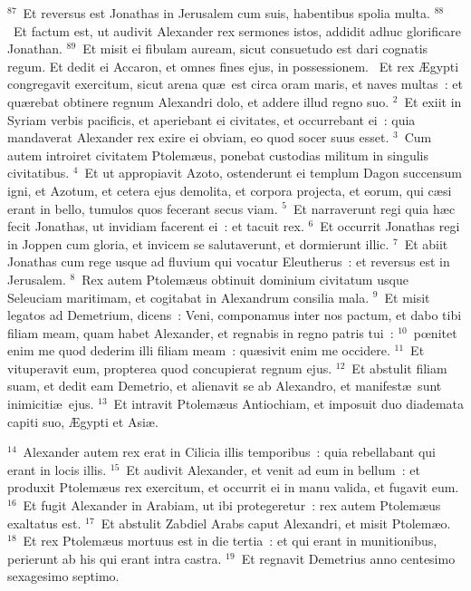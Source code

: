 ${}^{87}$~Et reversus est Jonathas in Jerusalem cum suis, habentibus spolia multa.
${}^{88}$~Et factum est, ut audivit Alexander rex sermones istos, addidit adhuc glorificare Jonathan.
${}^{89}$~Et misit ei fibulam auream, sicut consuetudo est dari cognatis regum. Et dedit ei Accaron, et omnes fines ejus, in possessionem.
~Et rex \AE gypti congregavit exercitum, sicut arena qu\ae\ est circa oram maris, et naves multas~: et qu\ae rebat obtinere regnum Alexandri dolo, et addere illud regno suo.
${}^{2}$~Et exiit in Syriam verbis pacificis, et aperiebant ei civitates, et occurrebant ei~: quia mandaverat Alexander rex exire ei obviam, eo quod socer suus esset.
${}^{3}$~Cum autem introiret civitatem Ptolem\ae us, ponebat custodias militum in singulis civitatibus.
${}^{4}$~Et ut appropiavit Azoto, ostenderunt ei templum Dagon succensum igni, et Azotum, et cetera ejus demolita, et corpora projecta, et eorum, qui c\ae si erant in bello, tumulos quos fecerant secus viam.
${}^{5}$~Et narraverunt regi quia h\ae c fecit Jonathas, ut invidiam facerent ei~: et tacuit rex.
${}^{6}$~Et occurrit Jonathas regi in Joppen cum gloria, et invicem se salutaverunt, et dormierunt illic.
${}^{7}$~Et abiit Jonathas cum rege usque ad fluvium qui vocatur Eleutherus~: et reversus est in Jerusalem.
${}^{8}$~Rex autem Ptolem\ae us obtinuit dominium civitatum usque Seleuciam maritimam, et cogitabat in Alexandrum consilia mala.
${}^{9}$~Et misit legatos ad Demetrium, dicens~: Veni, componamus inter nos pactum, et dabo tibi filiam meam, quam habet Alexander, et regnabis in regno patris tui~:
${}^{10}$~pœnitet enim me quod dederim illi filiam meam~: qu\ae sivit enim me occidere.
${}^{11}$~Et vituperavit eum, propterea quod concupierat regnum ejus.
${}^{12}$~Et abstulit filiam suam, et dedit eam Demetrio, et alienavit se ab Alexandro, et manifest\ae\ sunt inimiciti\ae\ ejus.
${}^{13}$~Et intravit Ptolem\ae us Antiochiam, et imposuit duo diademata capiti suo, \AE gypti et Asi\ae .


${}^{14}$~Alexander autem rex erat in Cilicia illis temporibus~: quia rebellabant qui erant in locis illis.
${}^{15}$~Et audivit Alexander, et venit ad eum in bellum~: et produxit Ptolem\ae us rex exercitum, et occurrit ei in manu valida, et fugavit eum.
${}^{16}$~Et fugit Alexander in Arabiam, ut ibi protegeretur~: rex autem Ptolem\ae us exaltatus est.
${}^{17}$~Et abstulit Zabdiel Arabs caput Alexandri, et misit Ptolem\ae o.
${}^{18}$~Et rex Ptolem\ae us mortuus est in die tertia~: et qui erant in munitionibus, perierunt ab his qui erant intra castra.
${}^{19}$~Et regnavit Demetrius anno centesimo sexagesimo septimo.


